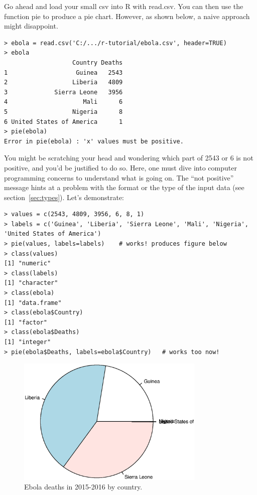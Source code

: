 \documentclass{report}
\newcommand{\code}[1]{\textsf{\ttfamily #1}}
\begin{document}
	Go ahead and load your small csv into R with \code{read.csv}. You can then use the function \code{pie} to produce a pie chart. However, as shown below, a naive approach might disappoint.
	\begin{verbatim}
> ebola = read.csv('C:/.../r-tutorial/ebola.csv', header=TRUE)
> ebola
                   Country Deaths
1                   Guinea   2543
2                  Liberia   4809
3             Sierra Leone   3956
4                     Mali      6
5                  Nigeria      8
6 United States of America      1
> pie(ebola)
Error in pie(ebola) : 'x' values must be positive.
	\end{verbatim}

	You might be scratching your head and wondering which part of 2543 or 6 is not positive, and you'd be justified to do so. Here, one must dive into computer programming concerns to understand what is going on. The ``not positive'' message hints at a problem with the format or the type of the input data (see section~\ref{sec:types}). Let's demonstrate:
	\begin{verbatim}
> values = c(2543, 4809, 3956, 6, 8, 1)
> labels = c('Guinea', 'Liberia', 'Sierra Leone', 'Mali', 'Nigeria', 'United States of America')
> pie(values, labels=labels)	# works! produces figure below
> class(values)
[1] "numeric"
> class(labels)
[1] "character"
> class(ebola)
[1] "data.frame"
> class(ebola$Country)
[1] "factor"
> class(ebola$Deaths)
[1] "integer"
> pie(ebola$Deaths, labels=ebola$Country)	# works too now!
	\end{verbatim}
	\begin{figure}[h]
		\centering
		\includegraphics[width=0.8\textwidth]{pie.eps}
		\caption{Ebola deaths in 2015-2016 by country.}
	\label{fig:pie}
	\end{figure}
\end{document}
